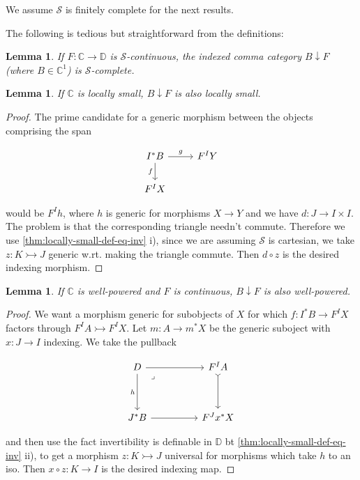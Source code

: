 \documentclass[10pt, oneside]{article}
\newtheorem{lemma}[theorem]{Lemma}
\begin{document}
We assume $\mathcal{S}$ is finitely complete for the next results.

The following is tedious but straightforward from the definitions:

\begin{lemma}
    If $F: \mathbb{C} \to \mathbb{D}$ is $\mathcal{S}$-continuous, the indexed comma category $B \downarrow F$ (where $B \in \mathbb{C}^1$) is $\mathcal{S}$-complete.
\end{lemma}


\begin{lemma}
    If $\mathbb{C}$ is locally small, $B \downarrow F$ is also locally small.
\end{lemma}
\begin{proof}
    The prime candidate for a generic morphism between the objects comprising the span

    \[\begin{tikzcd}[ampersand replacement=\&]
	{I^\ast B} \& {F^I Y} \\
	{F^I X}
	\arrow["f"', from=1-1, to=2-1]
	\arrow["g", from=1-1, to=1-2]
\end{tikzcd}\]

    \noindent would be $F^I h$, where $h$ is generic for morphisms $X \to Y$ and we have $d: J \to I \times I$. The problem is that the corresponding triangle needn't commute. Therefore we use \ref{thm:locally-small-def-eq-inv} i), since we are assuming $\mathcal{S}$ is cartesian, we take $z: K \rightarrowtail J$ generic w.rt. making the triangle commute. Then $d \circ z$ is the desired indexing morphism.
\end{proof}

\begin{lemma}
    If $\mathbb{C}$ is well-powered and $F$ is continuous, $B \downarrow F$ is also well-powered.
\end{lemma}
\begin{proof}
    We want a morphism generic for subobjects of $X$ for which $f: I^\ast B \to F^I X$ factors through $F^I A \rightarrowtail F^I X$. Let $m: A \to m^\ast X$ be the generic suboject with $x: J \to I$ indexing. We take the pullback

    \[\begin{tikzcd}[ampersand replacement=\&]
	D \&\& {F^I A} \\
	\\
	{J^\ast B} \&\& {F^J x^\ast X}
	\arrow[from=3-1, to=3-3]
	\arrow[tail, from=1-3, to=3-3]
	\arrow["h"', from=1-1, to=3-1]
	\arrow[from=1-1, to=1-3]
	\arrow["\lrcorner"{anchor=center, pos=0.125}, draw=none, from=1-1, to=3-3]
\end{tikzcd}\]
    
    \noindent and then use the fact invertibility is definable in $\mathbb{D}$ bt \ref{thm:locally-small-def-eq-inv} ii), to get a morphism $z: K \rightarrowtail J$ universal for morphisms which take $h$ to an iso. Then  $x \circ z:K \to I$ is the desired indexing map.
\end{proof}
\end{document}
